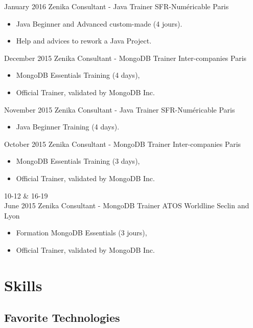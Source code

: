 \documentclass[11pt,a4paper,sans]{moderncv}
\begin{document}
\cventry
{January 2016}
{Zenika Consultant - Java Trainer}
{SFR-Numéricable}
{Paris}
{}
{\begin{itemize}
     \item Java Beginner and Advanced custom-made (4 jours).
     \item Help and advices to rework a Java Project.
\end{itemize}
}   %

\cventry
{December 2015}
{Zenika Consultant - MongoDB Trainer}
{Inter-companies}
{Paris}
{}
{\begin{itemize}
     \item MongoDB Essentials Training (4 days),
     \item Official Trainer, validated by MongoDB Inc.
\end{itemize}
}   %

\cventry
{November 2015}
{Zenika Consultant - Java Trainer}
{SFR-Numéricable}
{Paris}
{}
{\begin{itemize}
     \item Java Beginner Training (4 days).
\end{itemize}
}   %

\cventry
{October 2015}
{Zenika Consultant - MongoDB Trainer}
{Inter-companies}
{Paris}
{}
{\begin{itemize}
     \item MongoDB Essentials Training (3 days),
     \item Official Trainer, validated by MongoDB Inc.
\end{itemize}
}   %

\cventry
{10-12 \& 16-19\\ June 2015}
{Zenika Consultant - MongoDB Trainer}
{ATOS Worldline}
{Seclin and Lyon}
{}
{\begin{itemize}
     \item Formation MongoDB Essentials (3 jours),
     \item Official Trainer, validated by MongoDB Inc.
\end{itemize}
}   %

\section{Skills}\label{sec:skills}

\subsection{Favorite Technologies}\label{subsec:favorite-technologies}
\end{document}

